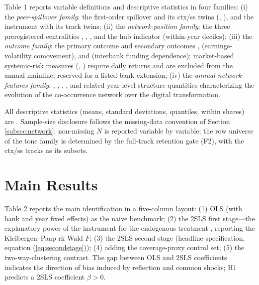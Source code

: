 Table 1 reports variable definitions and descriptive statistics in
four families:
(i) the \emph{peer-spillover family}: the first-order spillover
 and its ctx/ss twins
(, ), and the
instrument  with its track twins;
(ii) the \emph{network-position family}: the three preregistered
centralities ,
, , and the hub
indicator  (within-year deciles);
(iii) the \emph{outcome family}: the primary outcome  and
secondary outcomes ,
 (earnings-volatility comovement), and
 (interbank funding dependence);
market-based systemic-risk measures (,
) require daily returns and are excluded from the
annual mainline, reserved for a listed-bank extension;
(iv) the \emph{annual network-features family}:
, ,
, , and related
year-level structure quantities characterizing the evolution of the
co-occurrence network over the digital transformation.

All descriptive statistics (means, standard deviations, quantiles,
within shares) are .
Sample-size disclosure follows the missing-data convention of
Section \ref{subsec:network}: non-missing $N$ is reported variable
by variable; the row universe of the tone family is determined by
the full-track retention gate (F2), with the ctx/ss tracks as its
subsets.

\section{Main Results}\label{sec:main}

Table 2 reports the main identification in a five-column layout:
(1) OLS (with bank and year fixed effects) as the naive benchmark;
(2) the 2SLS first stage---the explanatory power of the instrument
 for the endogenous treatment
, reporting the Kleibergen--Paap rk
Wald $F$; (3) the 2SLS second stage (headline specification,
equation (\ref{eq:secondstage})); (4) adding the coverage-proxy
control set; (5) the two-way-clustering contrast. The gap between
OLS and 2SLS coefficients indicates the direction of bias induced by
reflection and common shocks; H1 predicts a 2SLS coefficient
$\beta > 0$.

